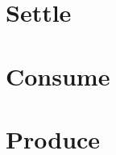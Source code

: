\documentclass[letterpaper,landscape,twocolumn,8pt]{extarticle}
\begin{document}

\section{Settle}%
\section{Consume}%
\section{Produce}%
\end{document}
